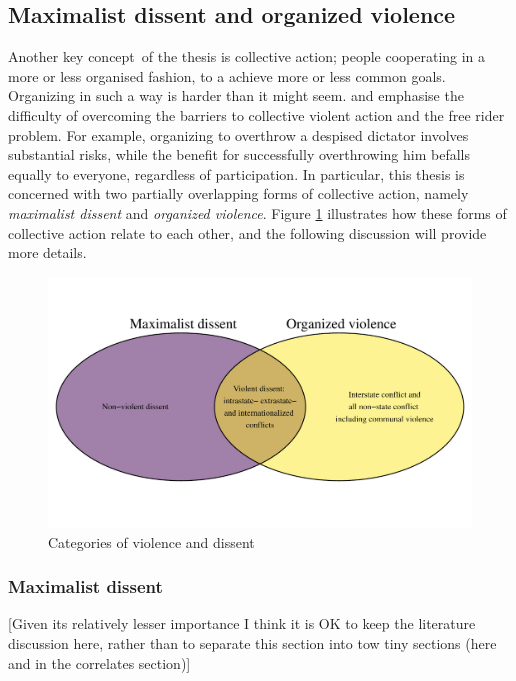 \subsection{Maximalist dissent and organized violence}
\label{Maximalist dissent and organized violence}

Another key concept of the thesis is collective action; people cooperating in a
more or less organised fashion, to a achieve more or less common goals.
Organizing in such a way is harder than it might seem.
\citet{OlsonMancur1965TLoC} and \citet{Tullock_1971} emphasise the difficulty of
overcoming the barriers to collective violent action and the free rider problem.
For example, organizing to overthrow a despised dictator involves substantial
risks, while the benefit for successfully overthrowing him befalls equally to
everyone, regardless of participation. In particular, this thesis is concerned
with two partially overlapping forms of collective action, namely
\textit{maximalist dissent} and \textit{organized violence}. Figure \ref{venn}
illustrates how these forms of collective action relate to each other, and the
following discussion will provide more details.

\begin{figure}[htpb]
	\centering
	\includegraphics[width=\textwidth]{../R/Output/venn.pdf}
	\caption{Categories of violence and dissent}
	\label{venn}
\end{figure}

\subsubsection{Maximalist dissent} \label{Maximalist dissent}

[Given its relatively lesser importance I think it is OK to keep the literature
discussion here, rather than to separate this section into tow tiny sections
(here and in the correlates section)]


